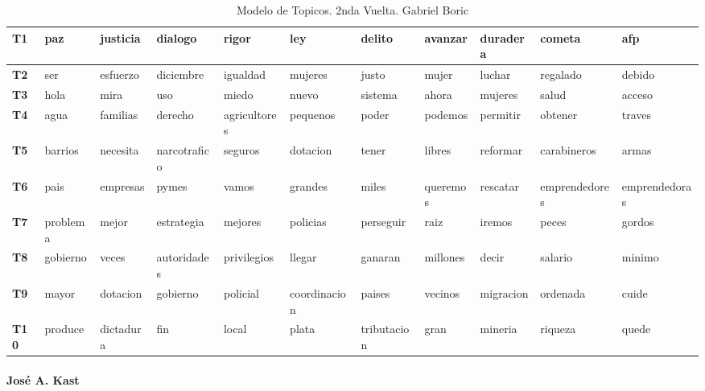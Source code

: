 \documentclass[
  10pt,
  letterpaper,
]{report}
\begin{document}
\begin{table}[!h]

\caption{\label{tab:Tabla9_boric}Modelo de Topicos. 2nda Vuelta. Gabriel Boric}
\centering
\fontsize{6}{8}\selectfont
\begin{tabular}[t]{>{\raggedright\arraybackslash}p{0.08in}|>{\raggedright\arraybackslash}p{0.4in}|>{\raggedright\arraybackslash}p{0.4in}|>{\raggedright\arraybackslash}p{0.4in}|>{\raggedright\arraybackslash}p{0.4in}|>{\raggedright\arraybackslash}p{0.4in}|>{\raggedright\arraybackslash}p{0.4in}|>{\raggedright\arraybackslash}p{0.4in}|>{\raggedright\arraybackslash}p{0.4in}|>{\raggedright\arraybackslash}p{0.4in}|l}
\hline
T1 & paz & justicia & dialogo & rigor & ley & delito & avanzar & duradera & cometa & afp\\
\hline
\textbf{T2} & ser & esfuerzo & diciembre & igualdad & mujeres & justo & mujer & luchar & regalado & debido\\
\hline
\textbf{T3} & hola & mira & uso & miedo & nuevo & sistema & ahora & mujeres & salud & acceso\\
\hline
\textbf{T4} & agua & familias & derecho & agricultores & pequenos & poder & podemos & permitir & obtener & traves\\
\hline
\textbf{T5} & barrios & necesita & narcotrafico & seguros & dotacion & tener & libres & reformar & carabineros & armas\\
\hline
\textbf{T6} & pais & empresas & pymes & vamos & grandes & miles & queremos & rescatar & emprendedores & emprendedoras\\
\hline
\textbf{T7} & problema & mejor & estrategia & mejores & policias & perseguir & raiz & iremos & peces & gordos\\
\hline
\textbf{T8} & gobierno & veces & autoridades & privilegios & llegar & ganaran & millones & decir & salario & minimo\\
\hline
\textbf{T9} & mayor & dotacion & gobierno & policial & coordinacion & paises & vecinos & migracion & ordenada & cuide\\
\hline
\textbf{T10} & produce & dictadura & fin & local & plata & tributacion & gran & mineria & riqueza & quede\\
\hline
\end{tabular}
\end{table}

\hypertarget{josuxe9-a.-kast-1}{%
\paragraph{José A. Kast}\label{josuxe9-a.-kast-1}}
\end{document}

